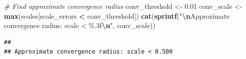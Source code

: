 \documentclass[
]{book}
\newenvironment{Shaded}{\begin{snugshade}}{\end{snugshade}}
\newcommand{\CommentTok}[1]{\textcolor[rgb]{0.56,0.35,0.01}{\textit{#1}}}
\newcommand{\FloatTok}[1]{\textcolor[rgb]{0.00,0.00,0.81}{#1}}
\newcommand{\FunctionTok}[1]{\textcolor[rgb]{0.13,0.29,0.53}{\textbf{#1}}}
\newcommand{\NormalTok}[1]{#1}
\newcommand{\OtherTok}[1]{\textcolor[rgb]{0.56,0.35,0.01}{#1}}
\newcommand{\SpecialCharTok}[1]{\textcolor[rgb]{0.81,0.36,0.00}{\textbf{#1}}}
\newcommand{\StringTok}[1]{\textcolor[rgb]{0.31,0.60,0.02}{#1}}
\theoremstyle{definition}
\theoremstyle{definition}
\theoremstyle{definition}
\theoremstyle{definition}
\theoremstyle{remark}
\begin{document}
\begin{Shaded}
\begin{Highlighting}[]
\CommentTok{\# Find approximate convergence radius}
\NormalTok{conv\_threshold }\OtherTok{\textless{}{-}} \FloatTok{0.01}
\NormalTok{conv\_scale }\OtherTok{\textless{}{-}} \FunctionTok{max}\NormalTok{(scales[scale\_errors }\SpecialCharTok{\textless{}}\NormalTok{ conv\_threshold])}
\FunctionTok{cat}\NormalTok{(}\FunctionTok{sprintf}\NormalTok{(}\StringTok{"}\SpecialCharTok{\textbackslash{}n}\StringTok{Approximate convergence radius: scale \textless{} \%.3f}\SpecialCharTok{\textbackslash{}n}\StringTok{"}\NormalTok{, conv\_scale))}
\end{Highlighting}
\end{Shaded}

\begin{verbatim}
## 
## Approximate convergence radius: scale < 0.500
\end{verbatim}
\end{document}
